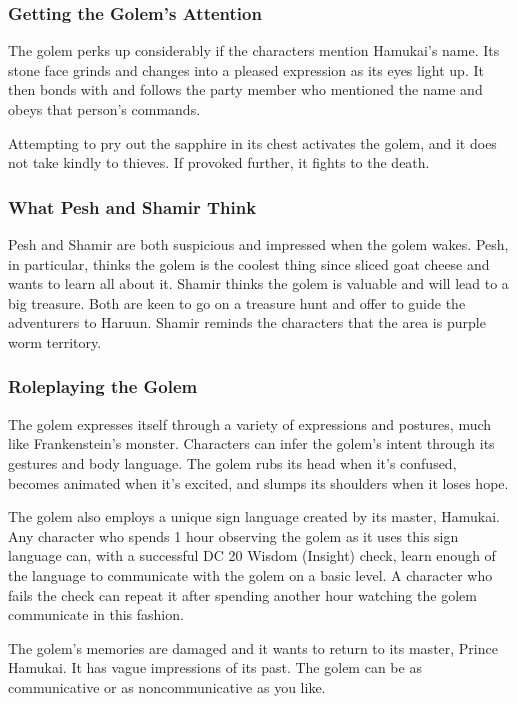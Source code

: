 \documentclass[10pt,a4paper,twoside,bg=print,twocolumn,openany,nodeprecatedcode]{dndbook}
\begin{document}
\subsubsection{Getting the Golem's Attention}
The golem perks up considerably if the characters mention Hamukai's name. Its stone face grinds and changes into a pleased expression as its eyes light up. It then bonds with and follows the party member who mentioned the name and obeys that person's commands.

Attempting to pry out the sapphire in its chest activates the golem, and it does not take kindly to thieves. If provoked further, it fights to the death.

\subsubsection{What Pesh and Shamir Think}
Pesh and Shamir are both suspicious and impressed when the golem wakes. Pesh, in particular, thinks the golem is the coolest thing since sliced goat cheese and wants to learn all about it. Shamir thinks the golem is valuable and will lead to a big treasure. Both are keen to go on a treasure hunt and offer to guide the adventurers to Haruun. Shamir reminds the characters that the area is purple worm territory.

\subsubsection{Roleplaying the Golem}
The golem expresses itself through a variety of expressions and postures, much like Frankenstein's monster. Characters can infer the golem's intent through its gestures and body language. The golem rubs its head when it's confused, becomes animated when it's excited, and slumps its shoulders when it loses hope.

The golem also employs a unique sign language created by its master, Hamukai. Any character who spends 1 hour observing the golem as it uses this sign language can, with a successful DC 20 Wisdom (Insight) check, learn enough of the language to communicate with the golem on a basic level. A character who fails the check can repeat it after spending another hour watching the golem communicate in this fashion.

The golem's memories are damaged and it wants to return to its master, Prince Hamukai. It has vague impressions of its past. The golem can be as communicative or as noncommunicative as you like.
\end{document}
